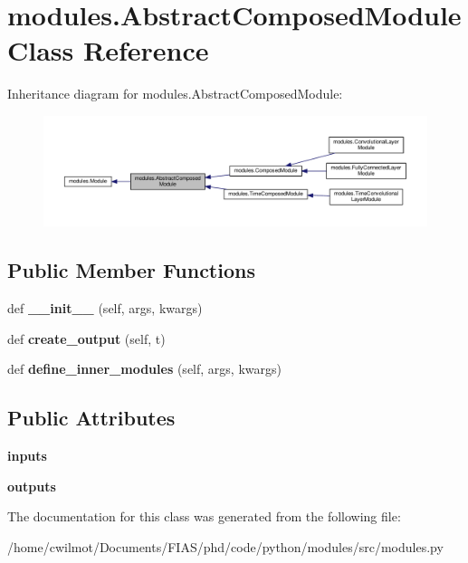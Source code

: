 \hypertarget{classmodules_1_1_abstract_composed_module}{}\section{modules.\+Abstract\+Composed\+Module Class Reference}
\label{classmodules_1_1_abstract_composed_module}


Inheritance diagram for modules.\+Abstract\+Composed\+Module\+:\nopagebreak
\begin{figure}[H]
\begin{center}
\leavevmode
\includegraphics[width=350pt]{classmodules_1_1_abstract_composed_module__inherit__graph}
\end{center}
\end{figure}
\subsection*{Public Member Functions}
\begin{DoxyCompactItemize}
\item 
\mbox{\label{classmodules_1_1_abstract_composed_module_a8571bf37cea3ff86c4a20cea449b0719}} 
def {\bfseries \+\_\+\+\_\+init\+\_\+\+\_\+} (self, args, kwargs)
\item 
\mbox{\label{classmodules_1_1_abstract_composed_module_a8418c1a28b4bfab116ecbebf54d9fed9}} 
def {\bfseries create\+\_\+output} (self, t)
\item 
\mbox{\label{classmodules_1_1_abstract_composed_module_aea4e1d5142ca898e92b82aa10e4aed88}} 
def {\bfseries define\+\_\+inner\+\_\+modules} (self, args, kwargs)
\end{DoxyCompactItemize}
\subsection*{Public Attributes}
\begin{DoxyCompactItemize}
\item 
\mbox{\label{classmodules_1_1_abstract_composed_module_a413abab6640553ac678ddef0a621ed62}} 
{\bfseries inputs}
\item 
\mbox{\label{classmodules_1_1_abstract_composed_module_a01418cc6e67e1ad7eef25bc15c898751}} 
{\bfseries outputs}
\end{DoxyCompactItemize}


The documentation for this class was generated from the following file\+:\begin{DoxyCompactItemize}
\item 
/home/cwilmot/\+Documents/\+F\+I\+A\+S/phd/code/python/modules/src/modules.\+py\end{DoxyCompactItemize}
